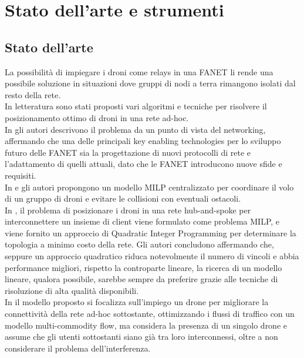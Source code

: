  \chapter{Stato dell'arte e strumenti} \label{chap:strumenti}

\ifpdf
    \graphicspath{{Chapter4/Figs/Raster/}{Chapter4/Figs/PDF/}{Chapter4/Figs/}}
\else
    \graphicspath{{Chapter4/Figs/Vector/}{Chapter4/Figs/}}
\fi

\section{Stato dell'arte}
La possibilità di impiegare i droni come relays in una FANET li rende una possibile soluzione in situazioni dove gruppi di nodi a terra rimangono isolati dal resto della rete. \\
In letteratura sono stati proposti vari algoritmi e tecniche per risolvere il posizionamento ottimo di droni in una rete ad-hoc. \\
In \cite{Sahingoz2014, 6477822} gli autori descrivono il problema da un punto di vista del networking, affermando che una delle principali key enabling technologies per lo sviluppo futuro delle FANET sia la progettazione di nuovi protocolli di rete e l'adattamento di quelli attuali, dato che le FANET introducono nuove sfide e requisiti. \\
In \cite{1023918} e \cite{Burdakov2010} gli autori propongono un modello MILP centralizzato per coordinare il volo di un gruppo di droni e evitare le collisioni con eventuali ostacoli. \\
In \cite{6564778}, il problema di posizionare i droni in una rete hub-and-spoke per interconnettere un insieme di client viene formulato come problema MILP, e viene fornito un approccio di Quadratic Integer Programming per determinare la topologia a minimo costo della rete.
Gli autori concludono affermando che, seppure un approccio quadratico riduca notevolmente il numero di vincoli e abbia performance migliori, rispetto la controparte lineare, la ricerca di un modello lineare, qualora possibile, sarebbe sempre da preferire grazie alle tecniche di risoluzione di alta qualità disponibili.\\
In \cite{4455114} il modello proposto si focalizza sull'impiego un drone per migliorare la connettività della rete ad-hoc sottostante, ottimizzando i flussi di traffico con un modello multi-commodity flow, ma considera la presenza di un singolo drone e assume che gli utenti sottostanti siano già tra loro interconnessi, oltre a non considerare il problema dell'interferenza. \\
